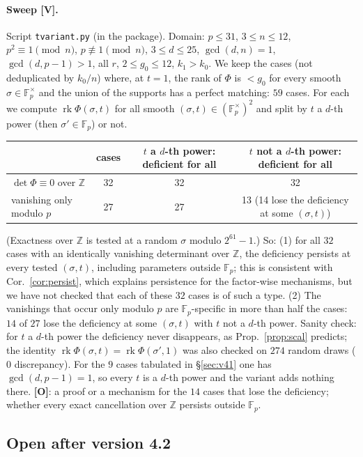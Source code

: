 \documentclass[11pt,a4paper]{article}
\newcommand{\F}{\mathbb{F}}
\begin{document}
\paragraph{Sweep \textbf{[V]}.} Script \texttt{tvariant.py} (in the package). Domain:
$p\le31$, $3\le n\le12$, $p^2\equiv1\pmod n$, $p\not\equiv1\pmod n$,
$3\le d\le25$, $\gcd(d,n)=1$, $\gcd(d,p-1)>1$, all $r$, $2\le g_0\le12$,
$k_1>k_0$. We keep the cases (not deduplicated by $k_0/n$) where, at $t=1$, the
rank of $\Phi$ is $<g_0$ for every smooth $\sigma\in\F_p^\times$ and the union of
the supports has a perfect matching: $59$ cases. For each we compute
$\operatorname{rk}\Phi(\sigma,t)$ for all smooth $(\sigma,t)\in(\F_p^\times)^2$
and split by $t$ a $d$-th power (then $\sigma'\in\F_p$) or not.
\begin{center}
\begin{tabular}{lccc}
 & cases & $t$ a $d$-th power: deficient for all & $t$ not a $d$-th power: deficient for all\\\hline
$\det\Phi\equiv0$ over $\mathbb Z$ & 32 & 32 & 32\\
vanishing only modulo $p$ & 27 & 27 & 13 (14 lose the deficiency at some $(\sigma,t)$)\\
\end{tabular}
\end{center}
(Exactness over $\mathbb Z$ is tested at a random $\sigma$ modulo $2^{61}-1$.) So:
(1) for all $32$ cases with an identically vanishing determinant over $\mathbb Z$,
the deficiency persists at every tested $(\sigma,t)$, including parameters outside
$\F_p$; this is consistent with Cor.~\ref{cor:persist}, which explains
persistence for the factor-wise mechanisms, but we have not checked that each of
these $32$ cases is of such a type. (2) The vanishings that occur only modulo $p$
are $\F_p$-specific in more than half the cases: $14$ of $27$ lose the deficiency
at some $(\sigma,t)$ with $t$ not a $d$-th power. Sanity check: for $t$ a $d$-th
power the deficiency never disappears, as Prop.~\ref{prop:scal} predicts; the
identity $\operatorname{rk}\Phi(\sigma,t)=\operatorname{rk}\Phi(\sigma',1)$ was
also checked on $274$ random draws ($0$ discrepancy). For the $9$ cases
tabulated in \S\ref{sec:v41} one has $\gcd(d,p-1)=1$, so every $t$ is a $d$-th
power and the variant adds nothing there. \textbf{[O]}: a proof or a mechanism for
the $14$ cases that lose the deficiency; whether every exact cancellation over
$\mathbb Z$ persists outside $\F_p$.

\subsection*{Open after version 4.2}
\end{document}

